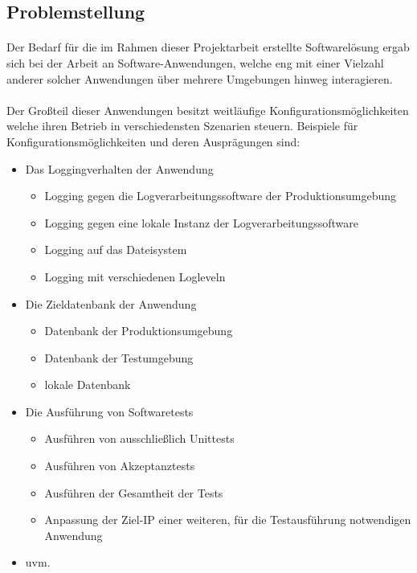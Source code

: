 \subsection{Problemstellung}
\paragraph{}
Der Bedarf für die im Rahmen dieser Projektarbeit erstellte Softwarelösung ergab
sich bei der Arbeit an Software-Anwendungen, welche eng mit einer Vielzahl
anderer solcher Anwendungen über mehrere Umgebungen hinweg interagieren.

\paragraph{}
Der Großteil dieser Anwendungen besitzt weitläufige Konfigurationsmöglichkeiten
welche ihren Betrieb in verschiedensten Szenarien steuern. Beispiele für
Konfigurationsmöglichkeiten und deren Ausprägungen sind:

\begin{itemize}
    \item Das Loggingverhalten der Anwendung
          \begin{itemize}
              \item Logging gegen die Logverarbeitungssoftware der Produktionsumgebung
              \item Logging gegen eine lokale Instanz der Logverarbeitungssoftware
              \item Logging auf das Dateisystem
              \item Logging mit verschiedenen Logleveln
          \end{itemize}
    \item Die Zieldatenbank der Anwendung \begin{itemize}
              \item Datenbank der Produktionsumgebung
              \item Datenbank der Testumgebung
              \item lokale Datenbank
          \end{itemize}
    \item Die Ausführung von Softwaretests \begin{itemize}
              \item Ausführen von ausschließlich Unittests
              \item Ausführen von Akzeptanztests
              \item Ausführen der Gesamtheit der Tests
              \item Anpassung der Ziel-IP einer weiteren, für die Testausführung
                    notwendigen Anwendung
          \end{itemize}
    \item uvm.
\end{itemize}

